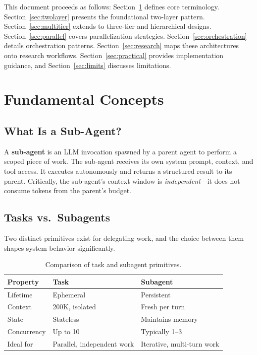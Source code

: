 \documentclass[11pt,letterpaper,twocolumn]{article}
\begin{document}
This document proceeds as follows: Section~\ref{sec:fundamentals} defines
core terminology.  Section~\ref{sec:twolayer} presents the foundational
two-layer pattern.  Section~\ref{sec:multitier} extends to three-tier and
hierarchical designs.  Section~\ref{sec:parallel} covers parallelization
strategies.  Section~\ref{sec:orchestration} details orchestration patterns.
Section~\ref{sec:research} maps these architectures onto research workflows.
Section~\ref{sec:practical} provides implementation guidance, and
Section~\ref{sec:limits} discusses limitations.

\section{Fundamental Concepts}
\label{sec:fundamentals}

\subsection{What Is a Sub-Agent?}

A \textbf{sub-agent} is an LLM invocation spawned by a parent agent to
perform a scoped piece of work.  The sub-agent receives its own system
prompt, context, and tool access.  It executes autonomously and returns a
structured result to its parent.  Critically, the sub-agent's context window
is \emph{independent}---it does not consume tokens from the parent's budget.

\subsection{Tasks vs.\ Subagents}

Two distinct primitives exist for delegating work, and the choice between
them shapes system behavior significantly.

\begin{table}[H]
\centering
\caption{Comparison of task and subagent primitives.}
\label{tab:task-vs-subagent}
\small
\begin{tabularx}{\columnwidth}{@{}lXX@{}}
\toprule
\textbf{Property} & \textbf{Task} & \textbf{Subagent} \\
\midrule
Lifetime    & Ephemeral       & Persistent \\
Context     & 200K, isolated  & Fresh per turn \\
State       & Stateless       & Maintains memory \\
Concurrency & Up to 10        & Typically 1--3 \\
Ideal for   & Parallel, independent work & Iterative, multi-turn work \\
\bottomrule
\end{tabularx}
\end{table}
\end{document}
